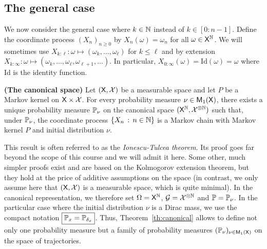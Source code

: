 \documentclass[english,graybox,envcountchap,envcountsame,sectrefs,shortlabels]{svmono}
\theoremstyle{style}
\newcommand{\bs}{\begin{shaded}}
\newcommand{\es}{\end{shaded}}
\begin{document}
\subsection{The general case }

We now consider the general case where $k\in\mathbb{N}$ instead of $k\in[0:n-1]$.
Define the coordinate process $(X_{n})_{n\geq 0}$ by $X_{n}(\omega)=\omega_{n}$
for all $\omega\in\mathsf{X}^{\mathbb{N}}$. We will sometimes use $X_{k:\ell}:\omega\mapsto(\omega_{k},\ldots,\omega_{\ell})$
for $k\leq\ell$ and by extension $X_{k:\infty}:\omega\mapsto(\omega_{k},\ldots,\omega_{\ell},\omega_{\ell+1},\dots)$.
In particular, $X_{0:\infty}(\omega)=\mathrm{Id}(\omega)=\omega$ where $\mathrm{Id}$
is the identity function.
\begin{theorem}
\label{th:canonical}
\textbf{(The canonical space)} Let $(\mathsf{X},\mathcal{X})$ be a measurable
space and let $P$ be a Markov kernel on $\mathsf{X}\times\mathcal{X}$. For
every probability measure $\nu\in\mathsf{M}_{1}(\mathsf{X})$, there exists a
unique probability measure $\mathbb{P}_{\nu}$ on the canonical space $(\mathsf{X}^{\mathbb{N}},\mathcal{X}^{\otimes\mathbb{N}})$
such that, under $\mathbb{P}_{\nu}$, the coordinate process $\left\{ X_{n}\,:\,n\in\mathbb{N}\right\}$
is a Markov chain with Markov kernel $P$ and initial distribution
$\nu$.
\end{theorem}
This result is often referred to as the \emph{Ionescu-Tulcea
theorem}. Its proof goes far beyond the scope of this course and we
will admit it here. Some other, much simpler proofs exist and are
based on the Kolmogorov extension theorem, but they hold at the price
of additive assumptions on the space (in contrast, we only assume
here that $(\mathsf{X},\mathcal{X})$ is a measurable space, which is quite
minimal). In the canonical representation, we therefore set $\Omega=\mathsf{X}^{\mathbb{N}}$,
$\mathcal{G}=\mathcal{X}^{\otimes\mathbb{N}}$ and $\mathbb{P}=\mathbb{P}_{\nu}$. In the particular
case where the initial distribution $\nu$ is a Dirac mass, we use
the compact notation $\boxed{\mathbb{P}_{x}=\mathbb{P}_{\delta_{x}}}$. Thus, Theorem~\ref{th:canonical} allows to define not only one probability measure but a family
of probability measures $(\mathbb{P}_{\nu})_{\nu\in\mathsf{M}_{1}(\mathsf{X})}$ on the
space of trajectories.
\end{document}
